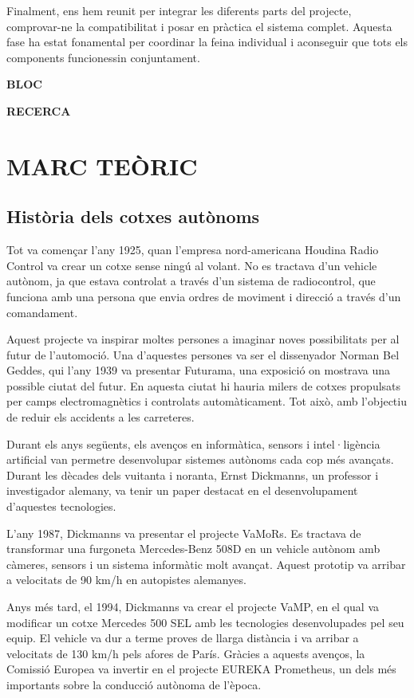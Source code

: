 \documentclass[11pt,a4paper]{article}
\newcommand{\bloc}[1]{%
  \clearpage
  \refstepcounter{part}%
  \phantomsection
  \addcontentsline{toc}{part}{BLOC \thepart: #1}%
  \thispagestyle{empty}%
  \null\vfill
  \begin{center}
    {\Large\bfseries BLOC \thepart\par}
    \vspace{1em}
    {\Huge\bfseries #1\par}
  \end{center}
  \vfill\null
  \clearpage}
\let\origsection\section
\renewcommand{\section}{\clearpage\origsection}
\begin{document}
Finalment, ens hem reunit per integrar les diferents parts del projecte, comprovar-ne la compatibilitat i posar en pràctica el sistema complet. Aquesta fase ha estat fonamental per coordinar la feina individual i aconseguir que tots els components funcionessin conjuntament.

\bloc{RECERCA}

\section{MARC TEÒRIC}

\subsection{Història dels cotxes autònoms}

Tot va començar l’any 1925, quan l’empresa nord-americana Houdina Radio Control va crear un cotxe sense ningú al volant. No es tractava d’un vehicle autònom, ja que estava controlat a través d’un sistema de radiocontrol, que funciona amb una persona que envia ordres de moviment i direcció a través d'un comandament.

Aquest projecte va inspirar moltes persones a imaginar noves possibilitats per al futur de l’automoció. Una d’aquestes persones va ser el dissenyador Norman Bel Geddes, qui l’any 1939 va presentar Futurama, una exposició on mostrava una possible ciutat del futur. En aquesta ciutat hi hauria milers de cotxes propulsats per camps electromagnètics i controlats automàticament. Tot això, amb l’objectiu de reduir els accidents a les carreteres.

Durant els anys següents, els avenços en informàtica, sensors i intel·ligència artificial van permetre desenvolupar sistemes autònoms cada cop més avançats. Durant les dècades dels vuitanta i noranta, Ernst Dickmanns, un professor i investigador alemany, va tenir un paper destacat en el desenvolupament d’aquestes tecnologies.

L’any 1987, Dickmanns va presentar el projecte VaMoRs. Es tractava de transformar una furgoneta Mercedes-Benz 508D en un vehicle autònom amb càmeres, sensors i un sistema informàtic molt avançat. Aquest prototip va arribar a velocitats de 90 km/h en autopistes alemanyes.

Anys més tard, el 1994, Dickmanns va crear el projecte VaMP, en el qual va modificar un cotxe Mercedes 500 SEL amb les tecnologies desenvolupades pel seu equip. El vehicle va dur a terme proves de llarga distància i va arribar a velocitats de 130 km/h pels afores de París. Gràcies a aquests avenços, la Comissió Europea va invertir en el projecte EUREKA Prometheus, un dels més importants sobre la conducció autònoma de l’època.
\end{document}
